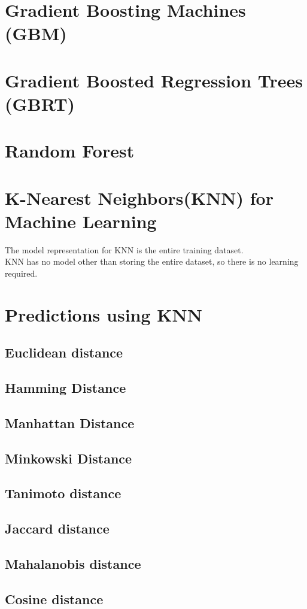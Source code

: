 \documentclass[14pt]{book}
\begin{document}
\section{Gradient Boosting Machines (GBM)}
\section{Gradient Boosted Regression Trees (GBRT)}
\section{Random Forest}
\section{K-Nearest Neighbors(KNN) for Machine Learning}
 The model representation for KNN is the entire training dataset. \\
 KNN has no model other than storing the entire dataset, so there is
  no learning required.
\section{Predictions using KNN}
\subsection{Euclidean distance}
\subsection{Hamming Distance}
\subsection{Manhattan Distance}
\subsection{Minkowski Distance}
\subsection{Tanimoto distance}
\subsection{Jaccard distance}
\subsection{Mahalanobis distance}
\subsection{Cosine distance}
\end{document}
